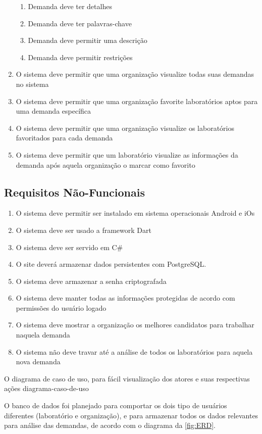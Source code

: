 \begin{enumerate}
\begin{enumerate}
		\item Demanda deve ter detalhes
		\item Demanda deve ter palavras-chave
		\item Demanda deve permitir uma descrição
		\item Demanda deve permitir restrições
	\end{enumerate}
	\item O sistema deve permitir que uma organização visualize todas suas demandas no sistema
	\item O sistema deve permitir que uma organização favorite laboratórios aptos para uma demanda específica
	\item O sistema deve permitir que uma organização visualize os laboratórios favoritados para cada demanda
	\item O sistema deve permitir que um laboratório visualize as informações da demanda após aquela organização o marcar como favorito
\end{enumerate}

\subsection{Requisitos Não-Funcionais}\label{subsec:ia1}
\begin{enumerate}
\item O sistema deve permitir ser instalado em sistema operacionais Android e iOs
\item O sistema deve ser usado a framework Dart
\item O sistema deve ser servido em C\#
\item O site deverá armazenar dados persistentes com PostgreSQL.
\item O sistema deve armazenar a senha criptografada
\item O sistema deve manter todas as informações protegidas de acordo com permissões do usuário logado
\item O sistema deve mostrar a organização os melhores candidatos para trabalhar naquela demanda
\item O sistema não deve travar até a análise de todos os laboratórios para aquela nova demanda
\end{enumerate}

O diagrama de caso de uso, para fácil visualização dos atores e suas respectivas ações {{diagrama-caso-de-uso}}

O banco de dados foi planejado para comportar os dois tipo de usuários diferentes (laboratório e organização), e para armazenar todos os dados relevantes para análise das demandas, de acordo com o diagrama da \autoref{fig:ERD}.

